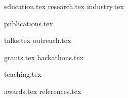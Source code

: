 \documentclass[letterpaper,11pt]{article}
\begin{document}


{education.tex}
{research.tex}
{industry.tex}

\pagebreak


{{publications.tex}}
\begin{minipage}[t]{0.47\textwidth}
{{talks.tex}}
{{outreach.tex}}
\end{minipage} \hspace{0.04\textwidth} \begin{minipage}[t]{0.46\textwidth}
{{grants.tex}}
{{hackathons.tex}}
\end{minipage}

\pagebreak

\begin{minipage}[t]{0.47\textwidth}
{ {teaching.tex}}
\end{minipage} \hspace{0.04\textwidth} \begin{minipage}[t]{0.46\textwidth}
{{awards.tex}}
{references.tex}
\end{minipage}


\end{document}
